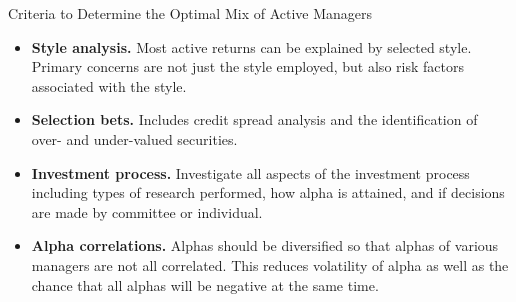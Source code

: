 \documentclass[../custom]{flashcards}
\begin{document}
\begin{flashcard}{Criteria to Determine the Optimal Mix of Active Managers}
    \begin{itemize}
        \item \textbf{Style analysis.} Most active returns can be explained by selected style. Primary concerns are not just the style employed, but also risk factors associated with the style.
        \item \textbf{Selection bets.} Includes credit spread analysis and the identification of over- and under-valued securities.
        \item \textbf{Investment process.} Investigate all aspects of the investment process including types of research performed, how alpha is attained, and if decisions are made by committee or individual.
        \item \textbf{Alpha correlations.} Alphas should be diversified so that alphas of various managers are not all correlated. This reduces volatility of alpha as well as the chance that all alphas will be negative at the same time.
    \end{itemize}
\end{flashcard}
\end{document}
